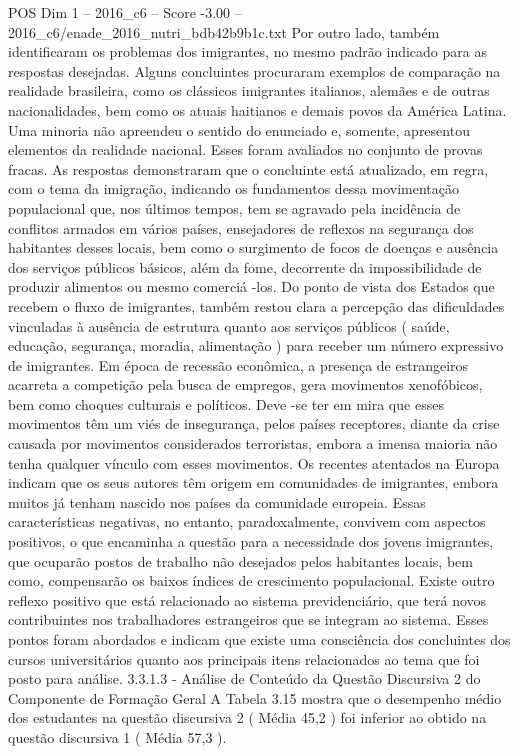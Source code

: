 \begin{textsample}{POS Dim 1 – 2016\_c6 – Score -3.00 – 2016\_c6/enade\_2016\_nutri\_bdb42b9b1c.txt}
Por outro lado, também identificaram os problemas dos imigrantes, no mesmo padrão indicado para as respostas desejadas.
Alguns concluintes procuraram exemplos de comparação na realidade brasileira, como os clássicos imigrantes italianos, alemães e de outras nacionalidades, bem como os atuais haitianos e demais povos da América Latina.
Uma minoria não apreendeu o sentido do enunciado e, somente, apresentou elementos da realidade nacional.
Esses foram avaliados no conjunto de provas fracas.
As respostas demonstraram que o concluinte está atualizado, em regra, com o tema da imigração, indicando os fundamentos dessa movimentação populacional que, nos últimos tempos, tem se agravado pela incidência de conflitos armados em vários países, ensejadores de reflexos na segurança dos habitantes desses locais, bem como o surgimento de focos de doenças e ausência dos serviços públicos básicos, além da fome, decorrente da impossibilidade de produzir alimentos ou mesmo comerciá -los.
Do ponto de vista dos Estados que recebem o fluxo de imigrantes, também restou clara a percepção das dificuldades vinculadas à ausência de estrutura quanto aos serviços públicos ( saúde, educação, segurança, moradia, alimentação ) para receber um número expressivo de imigrantes.
Em época de recessão econômica, a presença de estrangeiros acarreta a competição pela busca de empregos, gera movimentos xenofóbicos, bem como choques culturais e políticos.
Deve -se ter em mira que esses movimentos têm um viés de insegurança, pelos países receptores, diante da crise causada por movimentos considerados terroristas, embora a imensa maioria não tenha qualquer vínculo com esses movimentos.
Os recentes atentados na Europa indicam que os seus autores têm origem em comunidades de imigrantes, embora muitos já tenham nascido nos países da comunidade europeia.
Essas características negativas, no entanto, paradoxalmente, convivem com aspectos positivos, o que encaminha a questão para a necessidade dos jovens imigrantes, que ocuparão postos de trabalho não desejados pelos habitantes locais, bem como, compensarão os baixos índices de crescimento populacional.
Existe outro reflexo positivo que está relacionado ao sistema previdenciário, que terá novos contribuintes nos trabalhadores estrangeiros que se integram ao sistema.
Esses pontos foram abordados e indicam que existe uma consciência dos concluintes dos cursos universitários quanto aos principais itens relacionados ao tema que foi posto para análise. 3.3.1.3 - Análise de Conteúdo da Questão Discursiva 2 do Componente de Formação Geral A Tabela 3.15 mostra que o desempenho médio dos estudantes na questão discursiva 2 ( Média 45,2 ) foi inferior ao obtido na questão discursiva 1 ( Média 57,3 ).

\end{textsample}
